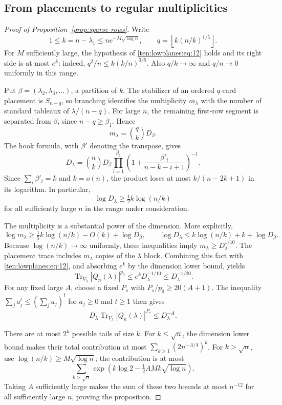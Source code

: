 \subsection{From placements to regular multiplicities}
\begin{proof}[Proof of Proposition~\ref{prop:sparse-rows}]
Write
\begin{equation}
 1\le k=n-\lambda_1\le ne^{-M\sqrt{\log n}},
 \qquad q=\left\lfloor k(n/k)^{1/5}\right\rfloor.
 \label{ten:lowplanes:eq:10}
\end{equation}
For $M$ sufficiently large, the hypothesis of \eqref{ten:lowplanes:eq:12} holds and its right side is at most $e^k$: indeed,
$q^2/n\le k(k/n)^{3/5}$. Also $q/k\to\infty$ and $q/n\to0$ uniformly in this range.

Put $\beta=(\lambda_2,\lambda_3,\ldots)$, a partition of $k$. The stabilizer of an ordered $q$-card placement is $S_{n-q}$, so branching identifies the multiplicity $m_\lambda$ with the number of standard tableaux of $\lambda/(n-q)$. For large $n$, the remaining first-row segment is separated from $\beta$, since $n-q\ge\beta_1$. Hence
\[
 m_\lambda=\binom qk D_\beta.
\]
The hook formula, with $\beta'$ denoting the transpose, gives
\begin{equation}
 D_\lambda=\binom nk D_\beta
 \prod_{i=1}^{\beta_1}
 \left(1+\frac{\beta'_i}{n-k-i+1}\right)^{-1}.
 \label{ten:lowplanes:eq:13}
\end{equation}
Since $\sum_i\beta'_i=k$ and $k=o(n)$, the product loses at most $k/(n-2k+1)$ in its logarithm. In particular,
\[
 \log D_\lambda\ge\tfrac12 k\log(n/k)
\]
for all sufficiently large $n$ in the range under consideration.

The multiplicity is a substantial power of the dimension. More explicitly,
\[
 \log m_\lambda\ge\tfrac15 k\log(n/k)-O(k)+\log D_\beta,
 \qquad
 \log D_\lambda\le k\log(n/k)+k+\log D_\beta.
\]
Because $\log(n/k)\to\infty$ uniformly, these inequalities imply $m_\lambda\ge D_\lambda^{1/10}$. The placement trace includes $m_\lambda$ copies of the $\lambda$ block. Combining this fact with \eqref{ten:lowplanes:eq:12}, and absorbing $e^k$ by the dimension lower bound, yields
\[
 \operatorname{Tr}_{V_\lambda}|Q_n(\lambda)|^{p_0}
 \le e^k D_\lambda^{-1/10}\le D_\lambda^{-1/20}.
\]
For any fixed large $A$, choose a fixed $P_s$ with $P_s/p_0\ge20(A+1)$. The inequality $\sum_j a_j^t\le(\sum_j a_j)^t$ for $a_j\ge0$ and $t\ge1$ then gives
\[
 D_\lambda\operatorname{Tr}_{V_\lambda}|Q_n(\lambda)|^{P_s}
 \le D_\lambda^{-A}.
\]

There are at most $2^k$ possible tails of size $k$. For $k\le\sqrt n$, the dimension lower bound makes their total contribution at most
$\sum_{k\ge1}(2n^{-A/4})^k$.
For $k>\sqrt n$, use $\log(n/k)\ge M\sqrt{\log n}$; the contribution is at most
\[
 \sum_{k>\sqrt n}
 \exp\!\left(k\log2-\tfrac12 A M k\sqrt{\log n}\right).
\]
Taking $A$ sufficiently large makes the sum of these two bounds at most $n^{-12}$ for all sufficiently large $n$, proving the proposition.
\end{proof}


